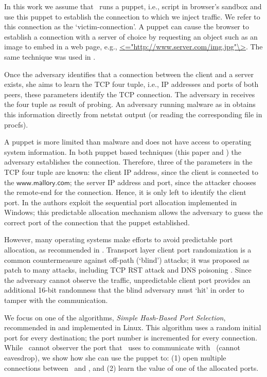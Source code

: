 \documentclass[conference]{IEEEtran}
\newcommand{\malcom}{\mbox{$\mathsf{www.mallory.com}$}}\newcommand{\victimserv}{\mbox{$\mathsf{www.victim\text{\textendash}server.com}$}}\newcommand{\malcoma}{\mbox{$\mathsf{www1.mallory.com}$}}
\begin{document}
In this work we assume that \mal\ runs a puppet, i.e., script in browser's sandbox and use this puppet to establish the connection to which we inject traffic. We refer to this connection as the `victim-connection'. A puppet can cause the browser to establish a connection with a server of choice by requesting an object such as an image to embed in a web page, e.g., \url{<}\url{="http://www.server.com/img.jpg"\>}. The same technique was used in \cite{woottcp}. 




Once the adversary identifies that a connection between the client and a server exists, she aims to learn the TCP four tuple, i.e., IP addresses and ports of both peers, these parameters identify the TCP connection. The adversary in \cite{lkm:phrack:07} receives the four tuple as result of probing. An adversary running malware as in \cite{snptcp} obtains this information directly from netstat output (or reading the corresponding file in procfs).

A puppet is more limited than malware and does not have access to operating system information. In both puppet based techniques (this paper and \cite{woottcp}) the adversary establishes the connection. Therefore, three of the parameters in the TCP four tuple are known: the client IP address, since the client is connected to the \malcom; the server IP address and port, since the attacker chooses the remote-end for the connection. Hence, it is only left to identify the client port. In \cite{woottcp} the authors exploit the sequential port allocation implemented in Windows; this predictable allocation mechanism allows the adversary to guess the correct port of the connection that the puppet established. 


However, many operating systems make efforts to avoid predictable port allocation, as recommended in \cite{rfc6056}. Transport layer client port randomization is a common countermeasure against off-path (`blind') attacks; it was proposed as patch to many attacks, including TCP RST attack \cite{watson2004slipping} and DNS poisoning \cite{kaminsky:dns}. Since the adversary cannot observe the traffic, unpredictable client port provides an additional 16-bit randomness that the blind adversary must `hit' in order to tamper with the communication. 

We focus on one of the algorithms, {\em Simple Hash-Based Port Selection}, recommended in \cite{rfc6056} and implemented in Linux. This algorithm uses a random initial port for every destination; the port number is incremented for every connection. While \mal\ cannot observer the port that \wini\ uses to communicate with \lin\ (cannot eavesdrop), we show how she can use the puppet to: (1) open multiple connections between \wini\ and \lin, and (2) learn the value of one of the allocated ports. 
\end{document}
